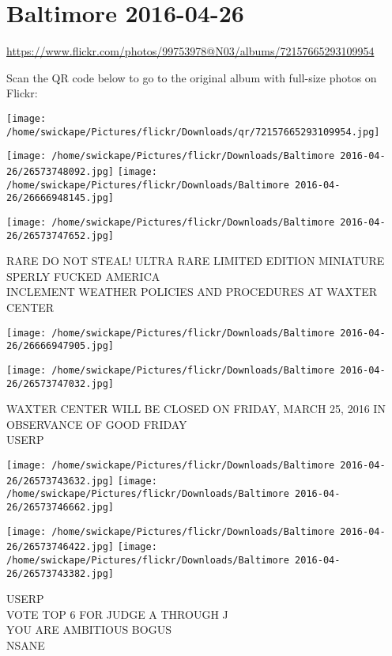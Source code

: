 \documentclass[10pt,letterpaper]{article}
\begin{document}
\section*{Baltimore 2016-04-26}

\url{https://www.flickr.com/photos/99753978@N03/albums/72157665293109954}

Scan the QR code below to go to the original album with full-size photos on Flickr:

\texttt{[image: /home/swickape/Pictures/flickr/Downloads/qr/72157665293109954.jpg]}
\pagebreak

\texttt{[image: /home/swickape/Pictures/flickr/Downloads/Baltimore 2016-04-26/26573748092.jpg]}
\texttt{[image: /home/swickape/Pictures/flickr/Downloads/Baltimore 2016-04-26/26666948145.jpg]}

\texttt{[image: /home/swickape/Pictures/flickr/Downloads/Baltimore 2016-04-26/26573747652.jpg]}

RARE DO NOT STEAL!  ULTRA RARE LIMITED EDITION MINIATURE\\
SPERLY FUCKED AMERICA\\
INCLEMENT WEATHER POLICIES AND PROCEDURES AT WAXTER CENTER
\pagebreak

\texttt{[image: /home/swickape/Pictures/flickr/Downloads/Baltimore 2016-04-26/26666947905.jpg]}

\vspace{0.25in}
\texttt{[image: /home/swickape/Pictures/flickr/Downloads/Baltimore 2016-04-26/26573747032.jpg]}

WAXTER CENTER WILL BE CLOSED ON FRIDAY, MARCH 25, 2016 IN OBSERVANCE OF GOOD FRIDAY\\
USERP
\pagebreak

\texttt{[image: /home/swickape/Pictures/flickr/Downloads/Baltimore 2016-04-26/26573743632.jpg]}
\texttt{[image: /home/swickape/Pictures/flickr/Downloads/Baltimore 2016-04-26/26573746662.jpg]}

\texttt{[image: /home/swickape/Pictures/flickr/Downloads/Baltimore 2016-04-26/26573746422.jpg]}
\texttt{[image: /home/swickape/Pictures/flickr/Downloads/Baltimore 2016-04-26/26573743382.jpg]}

USERP\\
VOTE TOP 6 FOR JUDGE A THROUGH J\\
YOU ARE AMBITIOUS BOGUS\\
NSANE
\pagebreak
\end{document}

